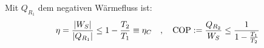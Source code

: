 \begin{definition}
    Mit $Q_{R_1}$ dem negativen Wärmefluss ist:
    \begin{align*}
        \eta = \frac{\left\vert W_S \right\vert}{\left\vert Q_{R_1} \right\vert} \leq 1 - \frac{T_2}{T_1} \equiv \eta_C
        \hspace{10pt} , \hspace{10pt}
        \text{COP} := \frac{Q_{R_2}}{W_S} \leq \frac{1}{1 - \frac{T_1}{T_2}}
    \end{align*}
\end{definition}


